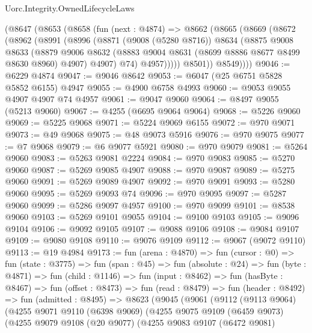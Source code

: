 \begin{lexlean}{Uorc.Integrity.OwnedLifecycleLaws}
\begin{coremodule}
    (@8647
      (@8653
        (@8658
          (fun (next : @4874) =>
          @8662
            (@8665
              (@8669
                (@8672
                  (@8962
                    (@8991
                      (@8996
                        (@8871
                          (@9008 (@5280 @8716))
                          @8634
                          (@8875
                            @9008
                            @8633
                            (@8879
                              @9006
                              @8632
                              (@8883 @9004 @8631 (@8699 @8886 @8677 @8499 @8630 @8960) @4907)
                              @4907)
                            @74)
                          @4957)))))
                @8501))
            @8549))))
@9046 := @6229 @4874
@9047 := @9046 @8642
@9053 := @6047 (@25 @6751 @5828 @5852 @6155) @4947
@9055 := @4900 @6758 @4993
@9060 := @9053 @9055 @4907 @4907 @74 @4957
@9061 := @9047 @9060
@9064 := @8497 @9055 (@5213 @9060)
@9067 := @4255 (@6695 @9064 @9064)
@9068 := @5226 @9060
@9069 := @5225 @9068
@9071 := @5224 @9069 @6155
@9072 := @970 @9071
@9073 := @49 @9068
@9075 := @48 @9073 @5916
@9076 := @970 @9075
@9077 := @7 @9068
@9079 := @6 @9077 @5921
@9080 := @970 @9079
@9081 := @5264 @9060
@9083 := @5263 @9081 @2224
@9084 := @970 @9083
@9085 := @5270 @9060
@9087 := @5269 @9085 @4907
@9088 := @970 @9087
@9089 := @5275 @9060
@9091 := @5269 @9089 @4907
@9092 := @970 @9091
@9093 := @5280 @9060
@9095 := @5269 @9093 @74
@9096 := @970 @9095
@9097 := @5287 @9060
@9099 := @5286 @9097 @4957
@9100 := @970 @9099
@9101 := @8538 @9060
@9103 := @5269 @9101 @9055
@9104 := @9100 @9103
@9105 := @9096 @9104
@9106 := @9092 @9105
@9107 := @9088 @9106
@9108 := @9084 @9107
@9109 := @9080 @9108
@9110 := @9076 @9109
@9112 := @9067 (@9072 @9110)
@9113 := @19 @4984
@9173 := fun (arena : @4870) =>
  fun (cursor : @0) =>
  fun (state : @3775) =>
  fun (span : @45) =>
  fun (absolute : @24) =>
  fun (byte : @4871) =>
  fun (child : @1146) =>
  fun (input : @8462) =>
  fun (hasByte : @8467) =>
  fun (offset : @8473) =>
  fun (read : @8479) =>
  fun (header : @8492) =>
  fun (admitted : @8495) =>
  @8623
    (@9045
      (@9061
        (@9112
          (@9113 @9064)
          (@4255
            @9071
            @9110
            (@6398 @9069)
            (@4255
              @9075
              @9109
              (@6459 @9073)
              (@4255
                @9079
                @9108
                (@20 @9077)
                (@4255
                  @9083
                  @9107
                  (@6472 @9081)

\end{coremodule}
\end{lexlean}
